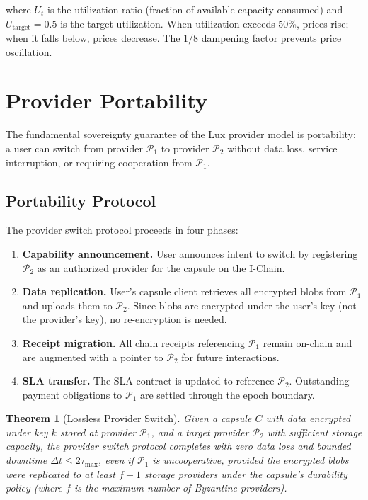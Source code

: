 \documentclass[11pt,a4paper]{article}
\newtheorem{theorem}{Theorem}
\begin{document}
where $U_t$ is the utilization ratio (fraction of available capacity
consumed) and $U_{\text{target}} = 0.5$ is the target utilization.
When utilization exceeds 50\%, prices rise; when it falls below, prices
decrease. The $1/8$ dampening factor prevents price oscillation.

\section{Provider Portability}\label{sec:portability}

The fundamental sovereignty guarantee of the Lux provider model is
portability: a user can switch from provider $\mathcal{P}_1$ to
provider $\mathcal{P}_2$ without data loss, service interruption,
or requiring cooperation from $\mathcal{P}_1$.

\subsection{Portability Protocol}

The provider switch protocol proceeds in four phases:

\begin{enumerate}
    \item \textbf{Capability announcement.} User announces intent to switch
    by registering $\mathcal{P}_2$ as an authorized provider for the capsule
    on the I-Chain.

    \item \textbf{Data replication.} User's capsule client retrieves all
    encrypted blobs from $\mathcal{P}_1$ and uploads them to $\mathcal{P}_2$.
    Since blobs are encrypted under the user's key (not the provider's key),
    no re-encryption is needed.

    \item \textbf{Receipt migration.} All chain receipts referencing
    $\mathcal{P}_1$ remain on-chain and are augmented with a pointer to
    $\mathcal{P}_2$ for future interactions.

    \item \textbf{SLA transfer.} The SLA contract is updated to reference
    $\mathcal{P}_2$. Outstanding payment obligations to $\mathcal{P}_1$
    are settled through the epoch boundary.
\end{enumerate}

\begin{theorem}[Lossless Provider Switch]\label{thm:portability}
Given a capsule $C$ with data encrypted under key $k$ stored at provider
$\mathcal{P}_1$, and a target provider $\mathcal{P}_2$ with sufficient
storage capacity, the provider switch protocol completes with zero data
loss and bounded downtime $\Delta t \leq 2\tau_{\max}$, even if
$\mathcal{P}_1$ is uncooperative, provided the encrypted blobs were
replicated to at least $f + 1$ storage providers under the capsule's
durability policy (where $f$ is the maximum number of Byzantine providers).
\end{theorem}
\end{document}
